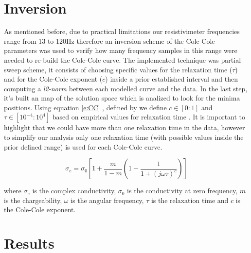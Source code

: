 \documentclass{vie16}
\begin{document}
\section{Inversion}
As mentioned before, due to practical limitations our resistivimeter frequencies 
range from $13$ to $120$Hz therefore an inversion scheme of the Cole-Cole parameters 
was used to verify how many frequency samples in this range were needed to
re-build the Cole-Cole curve. The implemented technique was partial sweep scheme,
it consists of choosing specific values for the relaxation time
($\tau$) and for the Cole-Cole exponent ($c$) inside a prior
established interval and then computing a \textit{l2-norm} between
each modelled curve and the data. In the last step, it's built an map
of the solution space which is analized to look for the minima
positions.  Using equation \ref{e:CC} , defined by \citet{tarasov13} we define $c \in [0:1]$ and
$\tau \in [10^{-4}:10^{4}]$ based on empirical values for relaxation time \citet{telford90}
. It is important to highlight that we could have more than
one relaxation time in the data, however to simplify our analysis only
one relaxation time (with possible values inside the prior defined
range) is used for each Cole-Cole curve.



\begin{equation}
	\sigma_{e} = \sigma_{0}
			\left[
			1 + \frac{m}{1-m}
						\left( 
								1 - \frac{1}{1+ \left( j\omega\tau \right)^{c} }	
						\right) 			
			\right]
	\label{e:CC}
\end{equation}

where $\sigma_{e}$ is the complex conductivity, $\sigma_{0}$ is the
conductivity at zero frequency, $m$ is the chargeability, $\omega$ is 
the angular frequency, $\tau$ is the relaxation time and $c$ is the 
Cole-Cole exponent.


\section{Results}



\end{document}
